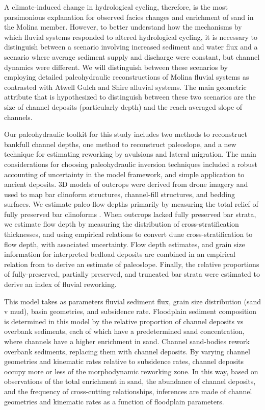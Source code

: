 \documentclass[draft]{compact_proposal}
\begin{document}
A climate-induced change in hydrological cycling, therefore, is the most parsimonious explanation for observed facies changes and enrichment of sand in the Molina member.
However, to better understand how the mechanisms by which fluvial systems responded to altered hydrological cycling, it is necessary to distinguish between a scenario involving increased sediment and water flux and a scenario where average sediment supply and discharge were constant, but channel dynamics were different.
We will distinguish between these scenarios by employing detailed paleohydraulic reconstructions of Molina fluvial systems as contrasted with Atwell Gulch and Shire alluvial systems.
The main geometric attribute that is hypothesized to distinguish between these two scenarios are the size of channel deposits (particularly depth) and the reach-averaged slope of channels.

Our paleohydraulic toolkit for this study includes two methods to reconstruct bankfull channel depths, one method to reconstruct paleoslope, and a new technique for estimating reworking by avulsions and lateral migration.
The main considerations for choosing paleohydraulic inversion techniques included a robust accounting of uncertainty in the model framework, and simple application to ancient deposits.
3D models of outcrops were derived from drone imagery and used to map bar clinoform structures, channel-fill structures, and bedding surfaces.
We estimate paleo-flow depths primarily by measuring the total relief of fully preserved bar clinoforms .
When outcrops lacked fully preserved bar strata, we estimate flow depth by measuring the distribution of cross-stratification thicknesses, and using empirical relations to convert dune cross-stratification to flow depth, with associated uncertainty.
Flow depth estimates, and grain size information for interpreted bedload deposits are combined in an empirical relation from \cnote[trampush] to derive an estimate of paleoslope.
Finally, the relative proportions of fully-preserved, partially preserved, and truncated bar strata were estimated to derive an index of fluvial reworking.

This model takes as parameters fluvial sediment flux, grain size distribution (sand v mud), basin geometries, and subsidence rate.
Floodplain sediment composition is determined in this model by the relative proportion of channel deposits vs overbank sediments, each of which have a predetermined sand concentration, where channels have a higher enrichment in sand.
Channel sand-bodies rework overbank sediments, replacing them with channel deposits.
By varying channel geometries and kinematic rates relative to subsidence rates, channel deposits occupy more or less of the morphodynamic reworking zone.
In this way, based on observations of the total enrichment in sand, the abundance of channel deposits, and the frequency of cross-cutting relationships, inferences are made of channel geometries and kinematic rates as a function of floodplain parameters.
\end{document}
